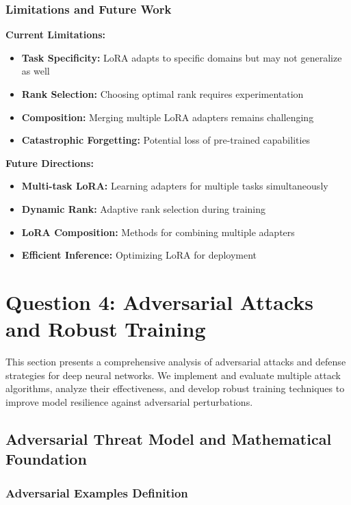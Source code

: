 \documentclass[conference]{IEEEtran}
\begin{document}
\subsubsection{Limitations and Future Work}
\label{sec:q3_limitations}

\textbf{Current Limitations:}
\begin{itemize}
  \item \textbf{Task Specificity:} LoRA adapts to specific domains but may not generalize as well
  \item \textbf{Rank Selection:} Choosing optimal rank requires experimentation
  \item \textbf{Composition:} Merging multiple LoRA adapters remains challenging
  \item \textbf{Catastrophic Forgetting:} Potential loss of pre-trained capabilities
\end{itemize}

\textbf{Future Directions:}
\begin{itemize}
  \item \textbf{Multi-task LoRA:} Learning adapters for multiple tasks simultaneously
  \item \textbf{Dynamic Rank:} Adaptive rank selection during training
  \item \textbf{LoRA Composition:} Methods for combining multiple adapters
  \item \textbf{Efficient Inference:} Optimizing LoRA for deployment
\end{itemize}

\section{Question 4: Adversarial Attacks and Robust Training}
\label{sec:q4}

This section presents a comprehensive analysis of adversarial attacks and defense strategies for deep neural networks. We implement and evaluate multiple attack algorithms, analyze their effectiveness, and develop robust training techniques to improve model resilience against adversarial perturbations.

\subsection{Adversarial Threat Model and Mathematical Foundation}
\label{sec:q4_threat_model}

\subsubsection{Adversarial Examples Definition}
\label{sec:q4_definition}
\end{document}
